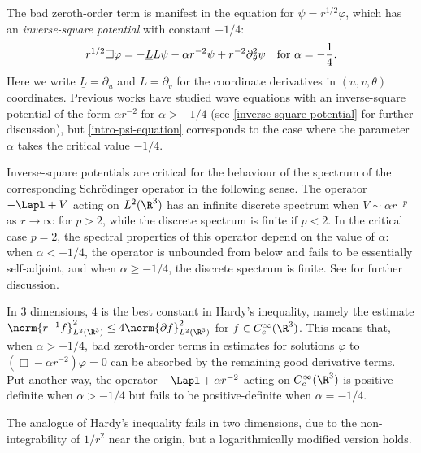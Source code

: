 \documentclass[10pt, reqno]{amsart}
\begin{document}
The bad zeroth-order term is manifest in the equation for \(\psi{} = r^{1/2}\varphi{}\),
which has an \emph{inverse-square potential} with constant \(-1/4\):
\begin{equation}\label{intro-psi-equation}
r^{1/2}\Box{}\varphi{}= -\underline{L}L\psi{}  -\alpha{}r^{-2}\psi{} + r^{-2}\partial{}_\theta^2\psi{}\quad \textnormal{for } \alpha{} = -\frac{1}{4}.
\end{equation}
Here we write \(\underline{L} = \partial_u\) and \(L = \partial_v\) for the coordinate
derivatives in \((u,v,\theta{})\) coordinates. Previous works have studied wave
equations with an inverse-square potential of the form \(\alpha{}r^{-2}\) for
\(\alpha{} > -1/4\) (see \cref{inverse-square-potential} for further discussion),
but \cref{intro-psi-equation} corresponds to the case where the parameter
\(\alpha{}\) takes the critical value \(-1/4\).
\begin{remark}[Criticality of inverse-square potentials of the form \(\alpha r^{-2}\) with \(\alpha = -1/4\)]
Inverse-square potentials are critical for the behaviour of the spectrum of the
corresponding Schrödinger operator in the following sense. The operator
\(-\Lapl + V\) acting on \(L^2(\R^3)\) has an infinite discrete spectrum when
\(V\sim \alpha{}r^{-p}\) as \(r\to \infty\) for \(p > 2\), while the discrete
spectrum is finite if \(p < 2\). In the critical case \(p = 2\), the spectral
properties of this operator depend on the value of \(\alpha{}\): when \(\alpha{}
< -1/4\), the operator is unbounded from below and fails to be essentially
self-adjoint, and when \(\alpha{}\ge -1/4\), the discrete spectrum is finite.
See \cite[Thm.~XII.6]{Reed1981-ph} for further discussion.
\label{intro-spectral}
\end{remark}
\begin{remark}[Relation between Hardy's inequality and the critical value \(\alpha{}=-1/4\)]
In \(3\) dimensions, \(4\) is the best constant in Hardy's inequality,
namely the estimate \(\norm{r^{-1}f}_{L^2(\R^3)}^2\le
4\norm{\partial{}f}_{L^2(\R^3)}^2\) for \(f\in C_c^\infty(\R^3)\). This means
that, when \(\alpha{} > -1/4\), bad zeroth-order terms in estimates for
solutions \(\varphi{}\) to \((\Box{}-\alpha{}r^{-2})\varphi{} = 0\) can be
absorbed by the remaining good derivative terms. Put another way, the operator
\(-\Lapl + \alpha{}r^{-2}\) acting on \(C_c^\infty(\R^3)\) is positive-definite
when \(\alpha{} > -1/4\) but fails to be positive-definite when \(\alpha{} = -1/4\).

The analogue of Hardy's inequality fails in two dimensions, due to the
non-integrability of \(1/r^2\) near the origin, but a logarithmically modified
version holds.
\label{intro-hardy}
\end{remark}
\end{document}
